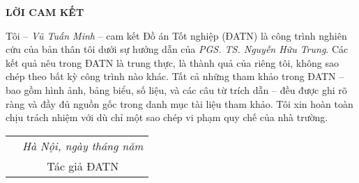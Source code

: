 \documentclass[../DoAn.tex]{subfiles}
\begin{document}
\hfill
\begin{center}
    \LARGE\textbf{LỜI CAM KẾT}\\
\end{center}
\vspace{1cm}

\vspace{1cm}
Tôi – \emph{Vũ Tuấn Minh} – cam kết Đồ án Tốt nghiệp (ĐATN) là công trình nghiên cứu của bản thân tôi dưới sự hướng dẫn của \emph{PGS. TS. Nguyễn Hữu Trung}. Các kết quả nêu trong ĐATN là trung thực, là thành quả của riêng tôi, không sao chép theo bất kỳ công trình nào khác. Tất cả những tham khảo trong ĐATN – bao gồm hình ảnh, bảng biểu, số liệu, và các câu từ trích dẫn – đều được ghi rõ ràng và đầy đủ nguồn gốc trong danh mục tài liệu tham khảo. Tôi xin hoàn toàn chịu trách nhiệm với dù chỉ một sao chép vi phạm quy chế của nhà trường.

\begin{table}[H]
\centering
\begin{tabular}{p{5cm} c}
\multicolumn{1}{c}{\textbf{}} &\emph{Hà Nội, ngày\hspace{0.5cm} tháng\hspace{0.5cm}   năm    }\vspace{0.4cm}\\
\textbf{}               & Tác giả ĐATN \vspace{3cm} %

\end{tabular}
\end{table}
\end{document}
